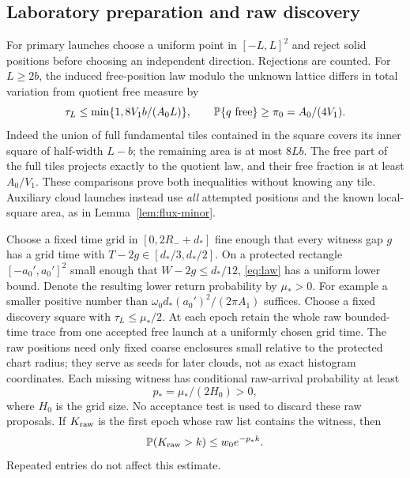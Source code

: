 \subsection{Laboratory preparation and raw discovery}
For primary launches choose a uniform point in $[-L,L]^2$ and reject
solid positions before choosing an independent direction. Rejections
are counted. For $L\ge2b$, the induced free-position law modulo the
unknown lattice differs in total variation from quotient free measure by
\begin{equation}\label{eq:square}
 \tau_L\le\min\{1,8V_1b/(A_0L)\},\qquad
 \mathbb P\{q\hbox{ free}\}\ge\pi_0=A_0/(4V_1).
\end{equation}
Indeed the union of full fundamental tiles contained in the square
covers its inner square of half-width $L-b$; the remaining area is at
most $8Lb$. The free part of the full tiles projects exactly to the
quotient law, and their free fraction is at least $A_0/V_1$.
These comparisons prove both inequalities without knowing any tile.
Auxiliary cloud launches instead use \emph{all} attempted positions and
the known local-square area, as in Lemma~\ref{lem:flux-minor}.

Choose a fixed time grid in $[0,2R_-+d_*]$ fine enough that every witness
gap $g$ has a grid time with $T-2g\in[d_*/3,d_*/2]$. On a protected
rectangle $[-a_0',a_0']^2$ small enough that $W-2g\le d_*/12$,
\eqref{eq:law} has a uniform lower bound. Denote the resulting lower
return probability by $\mu_*>0$. For example a smaller positive number
than $\omega_0d_*(a_0')^2/(2\pi A_1)$ suffices. Choose a fixed discovery
square with $\tau_L\le\mu_*/2$. At each epoch retain the whole raw
bounded-time trace from one accepted free launch at a uniformly chosen
grid time. The raw positions need only fixed coarse enclosures small
relative to the protected chart radius; they serve as seeds for later
clouds, not as exact histogram coordinates. Each missing witness has
conditional raw-arrival probability at least
\begin{equation}\label{eq:hazard}
                         p_*=\mu_*/(2H_0)>0,
\end{equation}
where $H_0$ is the grid size. No acceptance test is used to discard these
raw proposals. If $K_{\rm raw}$ is the first epoch whose raw list contains
the witness, then
\begin{equation}\label{eq:coupon}
                    \mathbb P(K_{\rm raw}>k)\le w_0e^{-p_*k}.
\end{equation}
Repeated entries do not affect this estimate.

